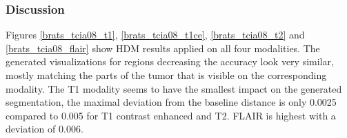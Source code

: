 \subsubsection{Discussion}
Figures \ref{brats_tcia08_t1}, \ref{brats_tcia08_t1ce}, \ref{brats_tcia08_t2} and \ref{brats_tcia08_flair} show HDM results applied on all four modalities. The generated visualizations for regions decreasing the accuracy look very similar, mostly matching the parts of the tumor that is visible on the corresponding modality. The T1 modality seems to have the smallest impact on the generated segmentation, the maximal deviation from the baseline distance is only 0.0025 compared to 0.005 for T1 contrast enhanced and T2. FLAIR is highest with a deviation of 0.006.